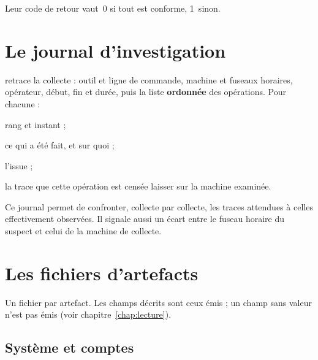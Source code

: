 \documentclass[11pt,a4paper,oneside]{report}
\begin{document}
Leur code de retour vaut~0 si tout est conforme, 1~sinon.





\section{Le journal d'investigation}

 retrace la collecte : outil et ligne de commande,
machine et fuseaux horaires, opérateur, début, fin et durée, puis la liste
\textbf{ordonnée} des opérations. Pour chacune :

\begin{description}[style=nextline,leftmargin=1.2em]
  \item[\champ{Seq}, \champ{TimestampUtc}, \champ{TimestampLocal}] rang et instant ;
  \item[\champ{Operation}, \champ{Target}] ce qui a été fait, et sur quoi ;
  \item[\champ{Result}] l'issue ;
  \item[\champ{Footprint}] la trace que cette opération est censée laisser sur la
        machine examinée.
\end{description}

Ce journal permet de confronter, collecte par collecte, les traces attendues à
celles effectivement observées. Il signale aussi un écart entre le fuseau horaire
du suspect et celui de la machine de collecte.

\section{Les fichiers d'artefacts}

Un fichier par artefact. Les champs décrits sont ceux émis ; un champ sans valeur
n'est pas émis (voir chapitre~\ref{chap:lecture}).

\subsection{Système et comptes}
\end{document}
